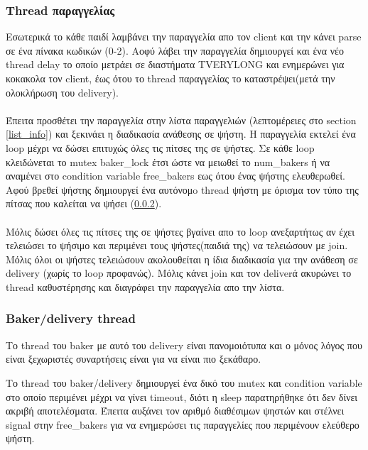 \documentclass{article}
\begin{document}
\subsubsection{Thread παραγγελίας}
\label{order}
Εσωτερικά το κάθε παιδί λαμβάνει την παραγγελία απο τον client και την κάνει parse σε ένα πίνακα κωδικών (0-2).
Αοφύ λάβει την παραγγελία δημιουργεί και ένα νέο thread delay το οποίο μετράει σε διαστήματα TVERYLONG και ενημερώνει για κοκακολα τον client, έως ότου το thread παραγγελίας το καταστρέψει(μετά την ολοκλήρωση του delivery).
\paragraph{}
Έπειτα προσθέτει την παραγγελία στην λίστα παραγγελιών (λεπτομέρειες στο section \ref{list_info}) και ξεκινάει η διαδικασία ανάθεσης σε ψήστη. H παραγγελία εκτελεί ένα loop μέχρι να δώσει επιτυχώς όλες τις πίτσες της σε ψήστες. Σε κάθε loop κλειδώνεται το mutex baker\_lock έτσι ώστε να μειωθεί το num\_bakers ή να αναμένει στο condition variable free\_bakers εως ότου ένας ψήστης ελευθερωθεί. Αφού βρεθεί ψήστης δημιουργεί ένα αυτόνομo thread ψήστη με όρισμα τον τύπο της πίτσας που καλείται να ψήσει
(\ref{baker}). 
\paragraph{}
Μόλις δώσει όλες τις πίτσες της σε ψήστες βγαίνει απο το loop ανεξαρτήτως αν έχει τελειώσει το ψήσιμο και περιμένει τους ψήστες(παιδιά της) να τελειώσουν με join. Μόλις όλοι οι ψήστες τελειώσουν ακολουθείται η ίδια διαδικασία για την ανάθεση σε delivery (χωρίς το loop προφανώς).
Μόλις κάνει join και τον deliverά ακυρώνει το thread καθυστέρησης και διαγράφει την παραγγελία απο την λίστα.

\subsubsection{Baker/delivery thread}
\label{baker}
Το thread του baker με αυτό του delivery είναι πανομοιότυπα 
και ο μόνος λόγος που είναι ξεχωριστές συναρτήσεις είναι για να είναι πιο ξεκάθαρο.
  
Το thread του baker/delivery δημιουργεί ένα δικό του mutex και condition variable στο οποίο περιμένει μέχρι να γίνει timeout, διότι η sleep παρατηρήθηκε ότι δεν δίνει ακριβή αποτελέσματα. Έπειτα αυξάνει τον αριθμό διαθέσιμων ψηστών και στέλνει signal στην free\_bakers για να ενημερώσει τις παραγγελίες που περιμένουν ελεύθερο ψήστη.
\end{document}
